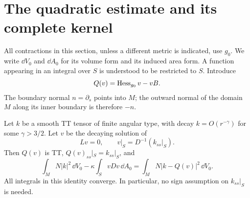 \section{The quadratic estimate and its complete kernel}
\label{sec:quadratic}

All contractions in this section, unless a different metric is indicated, use
$g_0$.  We write $\dd V_0$ and $\dd A_0$ for its volume form and its induced
area form.  A function appearing in an integral over $S$ is understood to be
restricted to $S$.  Introduce
\[
 Q(v)=\operatorname{Hess}_{g_0}v-vB.
\]
The boundary normal $n=\partial_s$ points into $M$; the outward normal of
the domain $M$ along its inner boundary is therefore $-n$.

\begin{lemma}
\label{lem:tt-square}
Let $k$ be a smooth TT tensor of finite angular type, with decay
$k=O(r^{-\gamma})$ for some $\gamma>3/2$.  Let $v$ be the decaying solution of
\begin{equation}
 Lv=0,
 \qquad v|_S=D^{-1}(k_{ss}|_S).
 \label{eq:tt-dirichlet}
\end{equation}
Then $Q(v)$ is TT, $Q(v)_{ss}|_S=k_{ss}|_S$, and
\begin{equation}
 \int_M N|k|^2\,\dd V_0
 -\kappa\int_S vDv\,\dd A_0
 =\int_M N|k-Q(v)|^2\,\dd V_0.
 \label{eq:tt-square}
\end{equation}
All integrals in this identity converge.  In particular, no sign assumption
on $k_{ss}|_S$ is needed.
\end{lemma}

